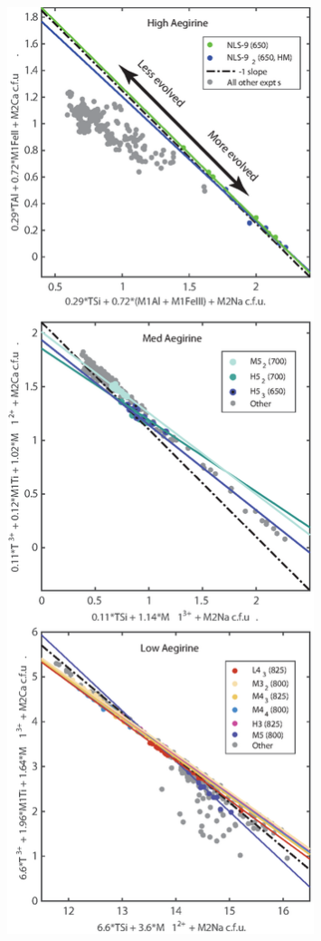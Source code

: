 \documentclass[review,authoryear,12pt]{elsarticle}
\begin{document}
\begin{figure}[htpb]
\begin{center}
\begin{minipage}[c]{.47\linewidth}
\includegraphics[width=0.8\textwidth]{S3_ExchMech_Feb2017-02.eps}

\end{minipage}
\end{center}
\end{figure}
\end{document}

